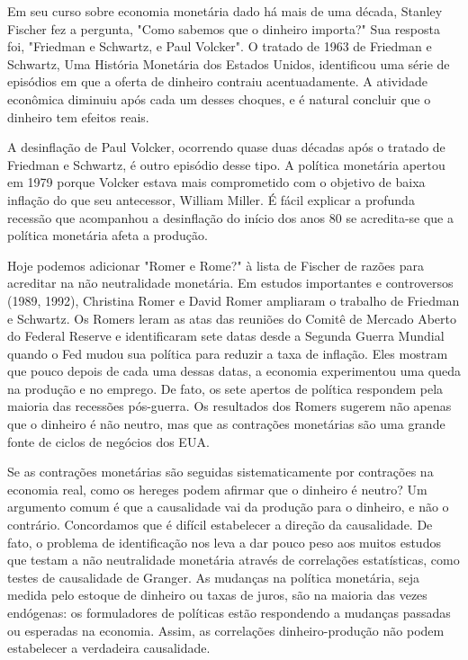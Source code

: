 \documentclass[12pt]{article}
\begin{document}
Em seu curso sobre economia monetária dado há mais de uma década, Stanley Fischer fez a pergunta, "Como sabemos que o dinheiro importa?" Sua resposta foi, "Friedman e Schwartz, e Paul Volcker". O tratado de 1963 de Friedman e Schwartz, Uma História Monetária dos Estados Unidos, identificou uma série de episódios em que a oferta de dinheiro contraiu acentuadamente. A atividade econômica diminuiu após cada um desses choques, e é natural concluir que o dinheiro tem efeitos reais.

A desinflação de Paul Volcker, ocorrendo quase duas décadas após o tratado de Friedman e Schwartz, é outro episódio desse tipo. A política monetária apertou em 1979 porque Volcker estava mais comprometido com o objetivo de baixa inflação do que seu antecessor, William Miller. É fácil explicar a profunda recessão que acompanhou a desinflação do início dos anos 80 se acredita-se que a política monetária afeta a produção.

Hoje podemos adicionar "Romer e Rome?" à lista de Fischer de razões para acreditar na não neutralidade monetária. Em estudos importantes e controversos (1989, 1992), Christina Romer e David Romer ampliaram o trabalho de Friedman e Schwartz. Os Romers leram as atas das reuniões do Comitê de Mercado Aberto do Federal Reserve e identificaram sete datas desde a Segunda Guerra Mundial quando o Fed mudou sua política para reduzir a taxa de inflação. Eles mostram que pouco depois de cada uma dessas datas, a economia experimentou uma queda na produção e no emprego. De fato, os sete apertos de política respondem pela maioria das recessões pós-guerra. Os resultados dos Romers sugerem não apenas que o dinheiro é não neutro, mas que as contrações monetárias são uma grande fonte de ciclos de negócios dos EUA.

Se as contrações monetárias são seguidas sistematicamente por contrações na economia real, como os hereges podem afirmar que o dinheiro é neutro? Um argumento comum é que a causalidade vai da produção para o dinheiro, e não o contrário. Concordamos que é difícil estabelecer a direção da causalidade. De fato, o problema de identificação nos leva a dar pouco peso aos muitos estudos que testam a não neutralidade monetária através de correlações estatísticas, como testes de causalidade de Granger. As mudanças na política monetária, seja medida pelo estoque de dinheiro ou taxas de juros, são na maioria das vezes endógenas: os formuladores de políticas estão respondendo a mudanças passadas ou esperadas na economia. Assim, as correlações dinheiro-produção não podem estabelecer a verdadeira causalidade.
\end{document}
